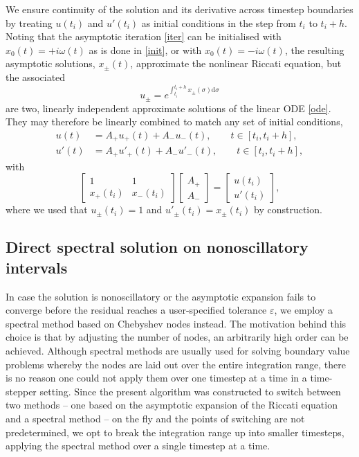 \documentclass[10pt]{article}
\newcommand{\be}{\begin{equation}}
\newcommand{\ee}{\end{equation}}
\newcommand{\om}{\omega}
\begin{document}
We ensure continuity of the solution and its derivative across timestep
boundaries by treating $u(t_i)$ and $u'(t_i)$ as initial conditions in the step
from $t_i$ to  $t_i+h$. Noting that the asymptotic iteration \cref{iter} can be
initialised with $x_0(t) = +i\om(t)$ as is done in \cref{init}, or with $x_0(t)
= -i\om(t)$, the resulting asymptotic solutions, $x_{\pm}(t)$, approximate the
nonlinear Riccati equation, but the associated 
\be
u_{\pm} = e^{\int_{t_i}^{t_i+h}x_{\pm}(\sigma)\mathrm{d}\sigma}
\ee
are two, linearly independent approximate solutions of the linear ODE \cref{ode}. They may therefore be linearly combined to match any set of initial conditions,
\begin{align}
    u(t) &= A_{+}u_{+}(t) + A_{-}u_{-}(t), \qquad t \in [t_i, t_i + h],\\
    u'(t) &= A_{+}u'_{+}(t) + A_{-}u'_{-}(t), \qquad t \in [t_i, t_i + h],
\end{align}
with 
\be
\begin{bmatrix}
    1 & 1 \\
    x_{+}(t_i) & x_{-}(t_i)
\end{bmatrix}
\begin{bmatrix}
    A_{+} \\
    A_{-}
\end{bmatrix}
= 
\begin{bmatrix}
    u(t_i) \\
    u'(t_i)
\end{bmatrix}, 
\ee
where we used that $u_{\pm}(t_i) = 1$ and $u'_{\pm}(t_i) = x_{\pm}(t_i)$ by construction.



\subsection{Direct spectral solution on nonoscillatory intervals \label{chebysteps}}

In case the solution is nonoscillatory or the asymptotic expansion fails to
converge before the residual reaches a user-specified tolerance $\varepsilon$, we
employ a spectral method based on Chebyshev nodes instead. The motivation
behind this choice is that by adjusting the number of nodes, an arbitrarily
high order can be achieved. Although spectral methods are usually used for
solving boundary value problems whereby the nodes are laid out over the entire
integration range, there is no reason one could not apply them over one timestep at a
time in a time-stepper setting. Since the present algorithm was constructed to
switch between two methods -- one based on the asymptotic expansion of the
Riccati equation and a spectral method -- on the fly and the points of
switching are not predetermined, we opt to break the integration range up into
smaller timesteps, applying the spectral method over a single timestep at a
time.
\end{document}

